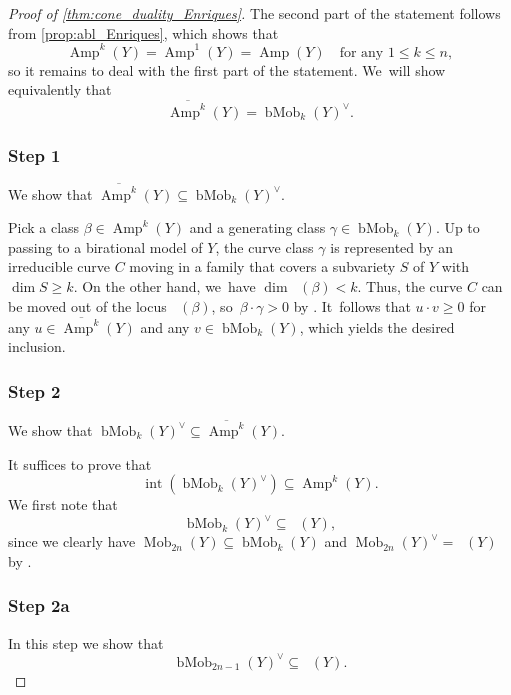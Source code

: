\documentclass[10pt]{amsart}
\theoremstyle{plain}
\theoremstyle{definition}
\DeclareMathOperator{\Amp}{\mathrm{Amp}}
\DeclareMathOperator{\Pseff}{\overline{\mathrm{Eff}}}
\DeclareMathOperator{\Movb}{\overline{\mathrm{Mov}}}
\DeclareMathOperator{\Mob}{Mob}
\DeclareMathOperator{\bMob}{bMob}
\DeclareMathOperator{\abs}{\boldsymbol{B}_{+}}
\begin{document}
\begin{proof}[Proof of \autoref{thm:cone_duality_Enriques}]
The second part of the statement follows from \autoref{prop:abl_Enriques}, which shows that
\[
\Amp^k(Y) = \Amp^1(Y) = \Amp(Y) \quad \text{for any } 1 \leq k \leq n,
\]
so it remains to deal with the first part of the statement. We~will show equivalently that
\[
\overline{\Amp^k}(Y) = \bMob_k(Y)^\vee.
\]

\subsubsection*{Step 1}
We show that $ \overline{\Amp^k}(Y) \subseteq \bMob_k(Y)^\vee$.

Pick a class $\beta \in \Amp^k(Y)$ and a generating class $\gamma \in \bMob_k(Y)$. Up to passing to a birational model of $Y$, the curve class $\gamma$ is represented by an irreducible curve $C$ moving in a family that covers a subvariety $S$ of $Y$ with $\dim S \geq k$.
On the other hand, we~have $\dim \abs(\beta) < k$.
Thus, the curve $C$ can be moved out of the locus $\abs(\beta)$, so~$\beta \cdot \gamma > 0$ by \cite[Rem.\,2.8]{DRO25}. It~follows that $u \cdot v \geq 0$ for any $u \in \overline{\Amp^k}(Y)$ and any $v \in \bMob_k(Y)$, which yields the desired inclusion.

\subsubsection*{Step 2}
We show that $ \bMob_k(Y)^\vee \subseteq \overline{\Amp^k}(Y)$.

It suffices to prove that
\begin{equation}
\label{eq:interiors}
\operatorname{int} \left(\bMob_k(Y)^{\vee} \right) \subseteq \Amp^k(Y).
\end{equation}
We first note that
\begin{equation}
\label{eq:1_bMob_in_pseff}
\bMob_k(Y)^{\vee} \subseteq \Pseff(Y),
\end{equation}
since we clearly have $\Mob_{2n}(Y) \subseteq \bMob_k(Y)$ and $\Mob_{2n}(Y)^{\vee} = \Pseff(Y)$ by \cite[Th.\,2.2]{BDPP13}.

\subsubsection*{Step 2a}
In this step we show that
\begin{equation}
\label{eq:2_bMob_in_Movb}
\bMob_{2n-1}(Y)^{\vee} \subseteq \Movb(Y).
\end{equation}


\end{proof}
\end{document}
